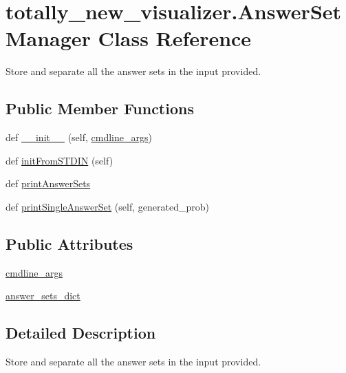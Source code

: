 \hypertarget{classtotally__new__visualizer_1_1_answer_set_manager}{}\section{totally\+\_\+new\+\_\+visualizer.\+Answer\+Set\+Manager Class Reference}
\label{classtotally__new__visualizer_1_1_answer_set_manager}


Store and separate all the answer sets in the input provided.  


\subsection*{Public Member Functions}
\begin{DoxyCompactItemize}
\item 
def \hyperlink{classtotally__new__visualizer_1_1_answer_set_manager_a6b6b2a2f3d8393f883b0f6e4846fb975}{\+\_\+\+\_\+init\+\_\+\+\_\+} (self, \hyperlink{classtotally__new__visualizer_1_1_answer_set_manager_a6720cc83312d81427e09bb5b3f7ceb02}{cmdline\+\_\+args})
\item 
def \hyperlink{classtotally__new__visualizer_1_1_answer_set_manager_a3717e2b3bf3f520ba8d66bfd4e884aa7}{init\+From\+S\+T\+D\+I\+N} (self)
\item 
def \hyperlink{classtotally__new__visualizer_1_1_answer_set_manager_a5db35c9928d6ff2894ab0fec0dc2b940}{print\+Answer\+Sets}
\item 
def \hyperlink{classtotally__new__visualizer_1_1_answer_set_manager_a9a77846f767cce9d64b75a8c7f4db6fd}{print\+Single\+Answer\+Set} (self, generated\+\_\+prob)
\end{DoxyCompactItemize}
\subsection*{Public Attributes}
\begin{DoxyCompactItemize}
\item 
\hyperlink{classtotally__new__visualizer_1_1_answer_set_manager_a6720cc83312d81427e09bb5b3f7ceb02}{cmdline\+\_\+args}
\item 
\hyperlink{classtotally__new__visualizer_1_1_answer_set_manager_add0e559366b050e585d2ba3f6f78def2}{answer\+\_\+sets\+\_\+dict}
\end{DoxyCompactItemize}


\subsection{Detailed Description}
Store and separate all the answer sets in the input provided. 

